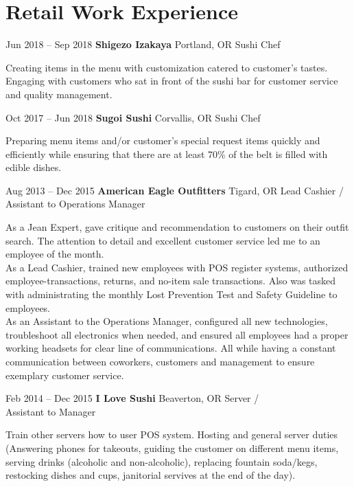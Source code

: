 \documentclass{tccv}
\begin{document}
\section{Retail Work Experience}
	 \begin{eventlist}
		 \item {Jun 2018 -- Sep 2018}
			 {\textbf{Shigezo Izakaya}	Portland, OR}
			 {Sushi Chef}

			 Creating items in the menu with customization catered to customer's tastes. 
			 Engaging with customers who sat in front of the sushi bar for customer service and quality management. 

		\item {Oct 2017 -- Jun 2018}
			{\textbf{Sugoi Sushi}	Corvallis, OR}
			{Sushi Chef}

			Preparing menu items and/or customer's special request items quickly and efficiently while ensuring that there are at least 70\% of the belt is filled with edible dishes.
			
		\item {Aug 2013 -- Dec 2015}
			{\textbf{American Eagle Outfitters}	Tigard, OR}
			{Lead Cashier /\\ Assistant to Operations Manager}
			
			As a Jean Expert, gave critique and recommendation to customers on their outfit search. The attention to detail and excellent customer service led me to an employee of the month.\\
			As a Lead Cashier, trained new employees with POS register systems, authorized employee-transactions, returns, and no-item sale transactions. Also was tasked with administrating the monthly Lost Prevention Test and Safety Guideline to employees.\\
			As an Assistant to the Operations Manager, configured all new technologies, troubleshoot all electronics when needed, and ensured all employees had a proper working headsets for clear line of communications. 
			All while having a constant communication between coworkers, customers and management to ensure exemplary customer service. 

		\item {Feb 2014 -- Dec 2015 }
			{\textbf{I Love Sushi}	Beaverton, OR}
			{Server /\\ Assistant to Manager}

			Train other servers how to user POS system. 
			Hosting and general server duties 
			(Answering phones for takeouts, 
			guiding the customer on different menu items,
			serving drinks (alcoholic and non-alcoholic),
			replacing fountain soda/kegs,
			restocking dishes and cups,
			janitorial servives at the end of the day).


\end{eventlist}
\end{document}
